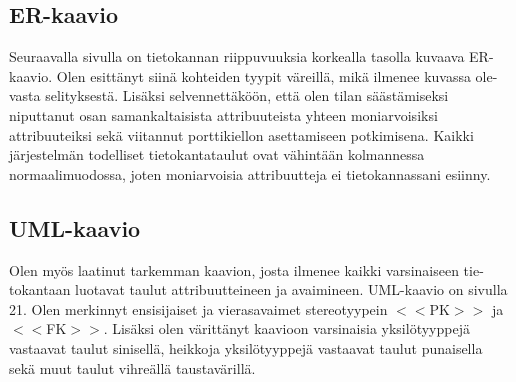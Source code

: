 \documentclass[11pt]{article}
\begin{document}
		\subsection{ER-kaavio} Seuraavalla sivulla on tietokannan riippuvuuksia korkealla tasolla kuvaava
		ER-kaavio. Olen esittänyt siinä kohteiden tyypit väreillä, mikä ilmenee kuvassa ole-vasta selityksestä.
		Lisäksi selvennettäköön, että olen tilan säästämiseksi niputtanut osan samankaltaisista attribuuteista
		yhteen moniarvoisiksi attribuuteiksi sekä viitannut porttikiellon asettamiseen potkimisena. Kaikki
		järjestelmän todelliset tietokantataulut ovat vähintään kolmannessa normaalimuodossa, joten moniarvoisia
		attribuutteja ei tietokannassani esiinny.
		
		\subsection{UML-kaavio} Olen myös laatinut tarkemman kaavion, josta ilmenee kaikki varsinaiseen
		tie-tokantaan luotavat taulut attribuutteineen ja avaimineen. UML-kaavio on sivulla 21. Olen merkinnyt
		ensisijaiset ja vierasavaimet stereotyypein $<<$PK$>>$ ja $<<$FK$>>$. Lisäksi olen värittänyt
		kaavioon varsinaisia yksilötyyppejä vastaavat taulut sinisellä, heikkoja yksilötyyppejä vastaavat
		taulut punaisella sekä muut taulut vihreällä taustavärillä.
		
\end{document}
